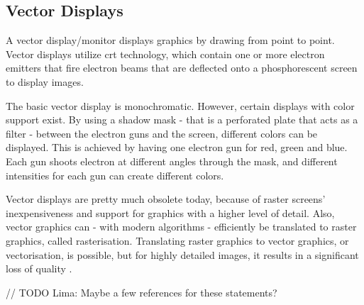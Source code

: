 \subsection{Vector Displays}
A vector display/monitor displays graphics by drawing from point to point.
Vector displays utilize \gls{crt} technology, which contain one or more electron emitters that fire electron beams that are deflected onto a phosphorescent screen to display images.

The basic vector display is monochromatic.
However, certain displays with color support exist.
By using a shadow mask - that is a perforated plate that acts as a filter - between the electron guns and the screen, different colors can be displayed. This is achieved by having one electron gun for red, green and blue. Each gun shoots electron at different angles through the mask, and different intensities for each gun can create different colors.

Vector displays are pretty much obsolete today, because of raster screens' inexpensiveness and support for graphics with a higher level of detail.
Also, vector graphics can - with modern algorithms - efficiently be translated to raster graphics, called rasterisation.
Translating raster graphics to vector graphics, or vectorisation, is possible, but for highly detailed images, it results in a significant loss of quality \cite{vectorisation}.

// TODO Lima: Maybe a few references for these statements?
